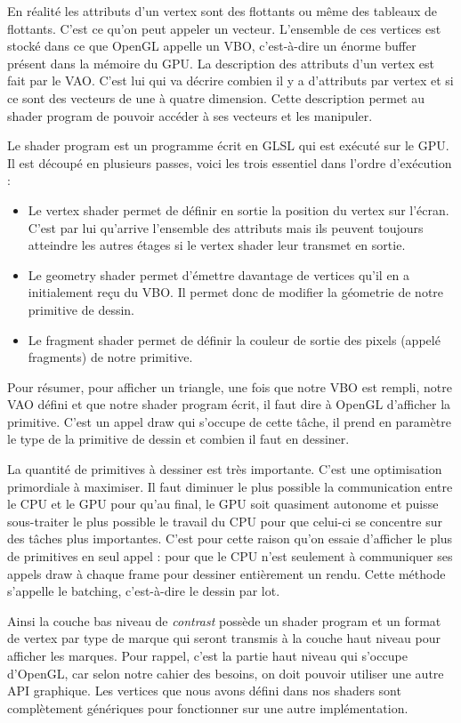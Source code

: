 \documentclass[12pt]{article}
\begin{document}
En réalité les attributs d'un vertex sont des flottants ou même des tableaux de flottants. C'est ce qu'on peut appeler un vecteur. L'ensemble de ces vertices est stocké dans ce
que OpenGL appelle un \gls{VBO}, c'est-à-dire un énorme buffer présent dans la mémoire du GPU. La description des attributs d'un vertex est fait par le \gls{VAO}.
C'est lui qui va décrire combien il y a d'attributs par vertex et si ce sont des vecteurs de une à quatre dimension.
Cette description permet au shader program de pouvoir accéder à ses vecteurs et les manipuler.

Le shader program est un programme écrit en \gls{GLSL} qui est exécuté sur le GPU. Il est découpé en plusieurs passes, voici les trois essentiel dans l'ordre d'exécution :
\begin{itemize}
    \item Le vertex shader permet de définir en sortie la position du vertex sur l'écran. C'est par lui qu'arrive l'ensemble
des attributs mais ils peuvent toujours atteindre les autres étages si le vertex shader leur transmet en sortie.
    \item Le geometry shader permet d'émettre davantage de vertices qu'il en a initialement reçu du VBO. Il permet donc de modifier la géometrie de notre primitive de dessin.
    \item Le fragment shader permet de définir la couleur de sortie des pixels (appelé fragments) de notre primitive.
\end{itemize}

Pour résumer, pour afficher un triangle, une fois que notre VBO est rempli, notre VAO défini et que notre shader program écrit, il faut dire à OpenGL d'afficher la primitive.
C'est un appel \og draw \fg{} qui s'occupe de cette tâche, il prend en paramètre le type de la primitive de dessin et combien il faut en dessiner.

La quantité de primitives à dessiner est très importante. C'est une optimisation primordiale à maximiser. Il faut diminuer le plus possible la communication entre le CPU et le GPU pour
qu'au final, le GPU soit quasiment autonome et puisse sous-traiter le plus possible le travail du CPU pour que celui-ci se concentre sur des tâches plus importantes.
C'est pour cette raison qu'on essaie d'afficher le plus de primitives en seul appel : pour que le CPU n'est seulement à communiquer ses appels draw à chaque frame pour dessiner entièrement
un rendu. Cette méthode s'appelle le batching, c'est-à-dire le dessin par lot.

Ainsi la couche bas niveau de \textit{contrast} possède un shader program et un format de vertex par type de marque qui seront transmis à la couche haut niveau pour afficher les marques.
Pour rappel, c'est la partie haut niveau qui s'occupe d'OpenGL, car selon notre cahier des besoins, on doit pouvoir utiliser une autre API graphique. Les vertices que nous avons
défini dans nos shaders sont complètement génériques pour fonctionner sur une autre implémentation.
\end{document}
